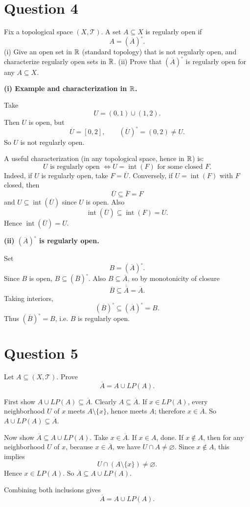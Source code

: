 \documentclass{article}
\begin{document}
\section{Question 4}

Fix a topological space $(X,\mathcal{T})$. A set $A\subseteq X$ is regularly open if
\[
A=(\overline A)^\circ.
\]
(i) Give an open set in $\mathbb{R}$ (standard topology) that is not regularly open, and characterize regularly open sets in $\mathbb{R}$.
(ii) Prove that $(\overline A)^\circ$ is regularly open for any $A\subseteq X$.

\begin{solution}
\textbf{(i) Example and characterization in $\mathbb{R}$.}

Take
\[
U=(0,1)\cup(1,2).
\]
Then $U$ is open, but
\[
\overline U=[0,2],\qquad (\overline U)^\circ=(0,2)\neq U.
\]
So $U$ is not regularly open.

A useful characterization (in any topological space, hence in $\mathbb{R}$) is:
\[
U\text{ is regularly open }\Longleftrightarrow U=\operatorname{int}(F)\text{ for some closed }F.
\]
Indeed, if $U$ is regularly open, take $F=\overline U$.
Conversely, if $U=\operatorname{int}(F)$ with $F$ closed, then
\[
\overline U\subseteq\overline F=F
\]
and $U\subseteq\operatorname{int}(\overline U)$ since $U$ is open. Also
\[
\operatorname{int}(\overline U)\subseteq\operatorname{int}(F)=U.
\]
Hence $\operatorname{int}(\overline U)=U$.

\textbf{(ii) $(\overline A)^\circ$ is regularly open.}

Set
\[
B=(\overline A)^\circ.
\]
Since $B$ is open, $B\subseteq(\overline B)^\circ$.
Also $B\subseteq\overline A$, so by monotonicity of closure
\[
\overline B\subseteq\overline{\overline A}=\overline A.
\]
Taking interiors,
\[
(\overline B)^\circ\subseteq(\overline A)^\circ=B.
\]
Thus $(\overline B)^\circ=B$, i.e. $B$ is regularly open.
\end{solution}

\section{Question 5}

Let $A\subseteq(X,\mathcal{T})$. Prove
\[
\overline A=A\cup LP(A).
\]

\begin{solution}
First show $A\cup LP(A)\subseteq\overline A$.
Clearly $A\subseteq\overline A$.
If $x\in LP(A)$, every neighborhood $U$ of $x$ meets $A\setminus\{x\}$, hence meets $A$; therefore $x\in\overline A$.
So $A\cup LP(A)\subseteq\overline A$.

Now show $\overline A\subseteq A\cup LP(A)$.
Take $x\in\overline A$.
If $x\in A$, done.
If $x\notin A$, then for any neighborhood $U$ of $x$, because $x\in\overline A$, we have $U\cap A\neq\varnothing$.
Since $x\notin A$, this implies
\[
U\cap(A\setminus\{x\})\neq\varnothing.
\]
Hence $x\in LP(A)$.
So $\overline A\subseteq A\cup LP(A)$.

Combining both inclusions gives
\[
\overline A=A\cup LP(A).
\]
\end{solution}
\end{document}
